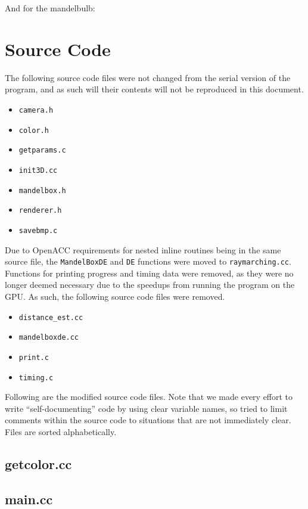 \documentclass[11pt]{article}
\begin{document}
And for the mandelbulb:




\section{Source Code}
The following source code files were not changed from the serial version of the program, and as such will their contents will not be reproduced in this document.
\begin{itemize}
\item \texttt{camera.h}
\item \texttt{color.h}
\item \texttt{getparams.c}
\item \texttt{init3D.cc}
\item \texttt{mandelbox.h}
\item \texttt{renderer.h}
\item \texttt{savebmp.c}
\end{itemize}

Due to OpenACC requirements for nested inline routines being in the same source file, the \texttt{MandelBoxDE} and \texttt{DE} functions were moved to \texttt{raymarching.cc}. Functions for printing progress and timing data were removed, as they were no longer deemed necessary due to the speedups from running the program on the GPU. As such, the following source code files were removed.
\begin{itemize}
\item \texttt{distance\_est.cc}
\item \texttt{mandelboxde.cc}
\item \texttt{print.c}
\item \texttt{timing.c}
\end{itemize}

Following are the modified source code files. Note that we made every effort to write ``self-documenting'' code by using clear variable names, so tried to limit comments within the source code to situations that are not immediately clear. Files are sorted alphabetically.

\subsection{getcolor.cc}


\subsection{main.cc}

\end{document}
